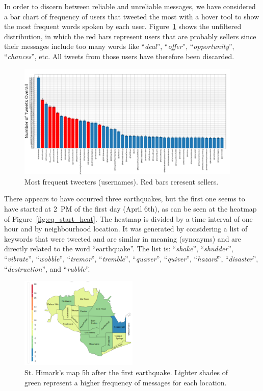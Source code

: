 In order to discern between reliable and unreliable messages, we have considered
a bar chart of frequency of users that tweeted the most with a hover tool to
show the most frequent words spoken by each user.
Figure~\ref{fig:most_freq_users} shows the unfiltered distribution, in which the
red bars represent users that are probably sellers since their messages include
too many words like ``\emph{deal}'', ``\emph{offer}'', ``\emph{opportunity}'',
``\emph{chances}'', etc. All tweets from those users have therefore been
discarded.

\begin{figure}[!h]
    \centering
    \includegraphics[width=0.95\textwidth]{figs/most_freq_users.png}
    \caption{Most frequent tweeters (usernames). Red bars reresent sellers.}
    \label{fig:most_freq_users}
\end{figure}

There appears to have occurred three earthquakes, but the first one seems to
have started at 2~PM of the first day (April 6th), as
can be seen at the heatmap of Figure~\ref{fig:eq_start_heat}. The heatmap is
divided by a time interval of one hour and by neighbourhood location. It was
generated by considering a list of keywords that were tweeted and are similar in 
meaning (synonyms) and are directly related to the word ``earthquake''. The list 
is: ``\emph{shake}'', ``\emph{shudder}'', ``\emph{vibrate}'', ``\emph{wobble}'',
``\emph{tremor}'', ``\emph{tremble}'', ``\emph{quaver}'', ``\emph{quiver}'',
``\emph{hazard}'', ``\emph{disaster}'', ``\emph{destruction}'', and
``\emph{rubble}''.

\begin{figure}[!h]
    \centering
    \includegraphics[width=0.50\textwidth]{figs/cond_5h/cond_5h_svg.png}
    \caption{St. Himark's map 5h after the first earthquake. Lighter shades of
    green represent a higher frequency of messages for each location.}
    \label{fig:map_5h}
\end{figure}

